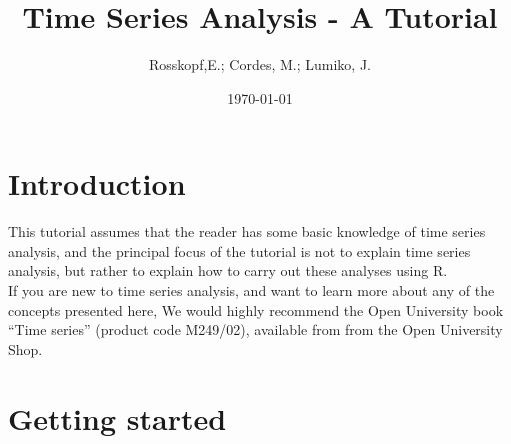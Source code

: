 \documentclass[11pt, a4paper]{article} %
\begin{document}

\title{Time Series Analysis - A Tutorial}
\author{Rosskopf,E.; Cordes, M.; Lumiko, J.}
\date{\today} %
\maketitle
{}
\tableofcontents
\pagebreak


\section{Introduction}
This tutorial assumes that the reader has some basic knowledge of time series analysis, and the principal focus of the tutorial is not to explain time series analysis, but rather to explain how to carry out these analyses using R.\\
\noindent
If you are new to time series analysis, and want to learn more about any of the concepts presented here, We would highly recommend the Open University book “Time series” (product code M249/02), available from from the Open University Shop.\\
\section{Getting started}%
\end{document}
